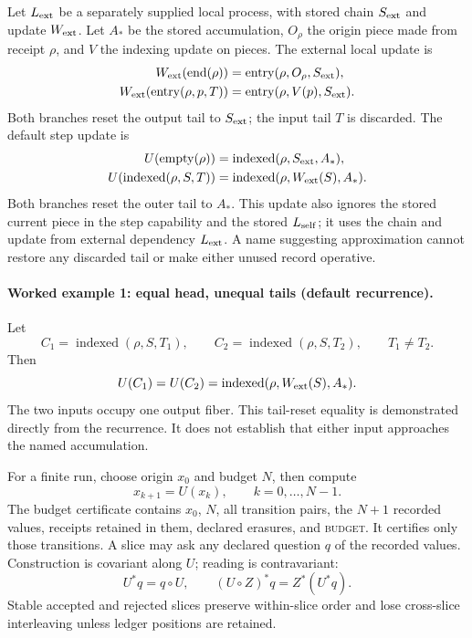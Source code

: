 Let \(L_{\rm ext}\) be a separately supplied local process, with stored chain \(S_{\rm ext}\) and update
\(W_{\rm ext}\).  Let \(A_*\) be the stored accumulation, \(O_\rho\) the origin piece made from receipt
\(\rho\), and \(V\) the indexing update on pieces.  The external local update is
\[
\begin{aligned}
 W_{\rm ext}(\operatorname{end}(\rho))
   &=\operatorname{entry}(\rho,O_\rho,S_{\rm ext}),\\
 W_{\rm ext}(\operatorname{entry}(\rho,p,T))
   &=\operatorname{entry}(\rho,V(p),S_{\rm ext}).
\end{aligned}
\]
Both branches reset the output tail to \(S_{\rm ext}\); the input tail \(T\) is discarded.  The default step update is
\[
\begin{aligned}
 U(\operatorname{empty}(\rho))
   &=\operatorname{indexed}(\rho,S_{\rm ext},A_*),\\
 U(\operatorname{indexed}(\rho,S,T))
   &=\operatorname{indexed}(\rho,W_{\rm ext}(S),A_*).
\end{aligned}
\]
Both branches reset the outer tail to \(A_*\).  This update also ignores the stored current piece in the step
capability and the stored \(L_{\rm self}\); it uses the chain and update from external dependency
\(L_{\rm ext}\).  A name suggesting approximation cannot restore any discarded tail or make either unused record
operative.

\paragraph{Worked example 1: equal head, unequal tails (default recurrence).}
Let
\[
 C_1=\operatorname{indexed}(\rho,S,T_1),\qquad
 C_2=\operatorname{indexed}(\rho,S,T_2),\qquad T_1\ne T_2.
\]
Then
\[
             U(C_1)=U(C_2)=\operatorname{indexed}(\rho,W_{\rm ext}(S),A_*).
\]
The two inputs occupy one output fiber.  This tail-reset equality is demonstrated directly from the recurrence.  It
does not establish that either input approaches the named accumulation.

For a finite run, choose origin \(x_0\) and budget \(N\), then compute
\[
                         x_{k+1}=U(x_k),\qquad k=0,\ldots,N-1.
\]
The budget certificate contains \(x_0\), \(N\), all transition pairs, the \(N+1\) recorded values, receipts retained in
them, declared erasures, and \textsc{budget}.  It certifies only those transitions.  A slice may ask any declared
question \(q\) of the recorded values.  Construction is covariant along \(U\); reading is contravariant:
\[
                    U^*q=q\circ U,\qquad
                    (U\circ Z)^*q=Z^*(U^*q).
\]
Stable accepted and rejected slices preserve within-slice order and lose cross-slice interleaving unless ledger
positions are retained.

